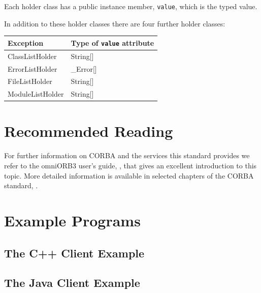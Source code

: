 \documentclass[\pformat,12pt]{article}
\begin{document}
Each holder class has a public instance member, \texttt{value}, which is
the typed value.

In addition to these holder classes there are four further holder
classes: 

\begin{tabular}{|>{\ttfamily}p{5.5cm}|>{\ttfamily}p{5.5cm}|}
  \hline
\textrm{\bfseries Exception} & \textrm{\bfseries Type of \texttt{value} attribute}
  \\ \hline
ClassListHolder  &  String[] \\ \hline
ErrorListHolder  &  \_Error[] \\ \hline
FileListHolder   & String[] \\ \hline
ModuleListHolder & String[] \\ \hline
\end{tabular}


\newpage
\section{Recommended Reading}
For further information on CORBA and the services this standard
provides we refer to the omniORB3 user's guide, \cite{omniORB3}, that
gives an excellent introduction to this topic. More detailed
information is available in selected chapters of the CORBA standard,
\cite{OMG&96}. 

%



\newpage
\appendix

\newpage
\section{Example Programs}
\subsection{The C++ Client Example}
\label{A3}
\subsection{The Java Client Example}
\label{A4}
\end{document}
